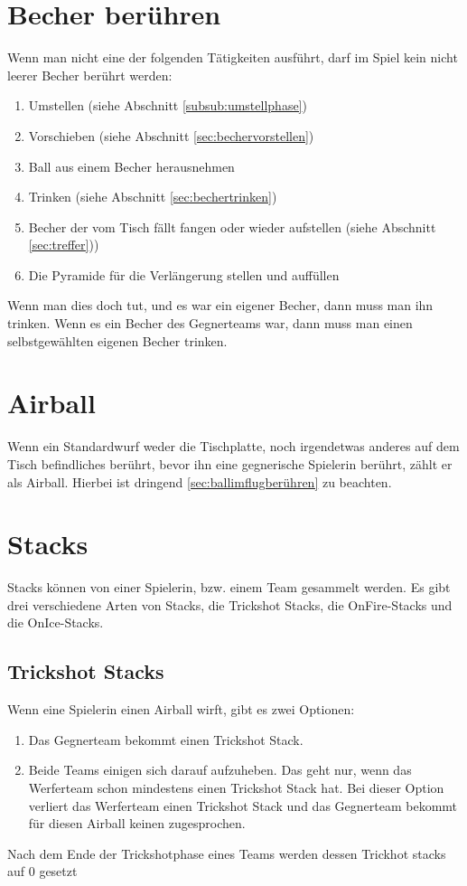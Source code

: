 \documentclass[a5paper, 12pt]{book}
\begin{document}
\section{Becher berühren}\label{sec:becherberühren}
Wenn man nicht eine der folgenden Tätigkeiten ausführt, darf im Spiel kein nicht leerer Becher berührt werden:
\begin{enumerate} [(1)]
    \item Umstellen (siehe Abschnitt \ref{subsub:umstellphase})
    \item Vorschieben (siehe Abschnitt \ref{sec:bechervorstellen})
    \item Ball aus einem Becher herausnehmen
    \item Trinken (siehe Abschnitt \ref{sec:bechertrinken})
    \item Becher der vom Tisch fällt fangen oder wieder aufstellen (siehe Abschnitt \ref{sec:treffer}))
    \item Die Pyramide für die Verlängerung stellen und auffüllen
    
\end{enumerate}
Wenn man dies doch tut, und es war ein eigener Becher, dann muss man ihn trinken. Wenn es ein Becher des Gegnerteams war, dann muss man einen selbstgewählten eigenen Becher trinken. 
\section{Airball}\label{sec:Airball}
Wenn ein Standardwurf weder die Tischplatte, noch irgendetwas anderes auf dem Tisch befindliches berührt, bevor ihn eine gegnerische Spielerin berührt, zählt er als Airball. Hierbei ist dringend \ref{sec:ballimflugberühren} zu beachten. 
\section{Stacks}\label{sec:stacks}
Stacks können von einer Spielerin, bzw. einem Team gesammelt werden. Es gibt drei verschiedene Arten von Stacks, die Trickshot Stacks, die OnFire-Stacks und die OnIce-Stacks.
\subsection{Trickshot Stacks}\label{sub:trickshotstacks}
Wenn eine Spielerin einen Airball wirft, gibt es zwei Optionen:
\begin{enumerate} [(1)]
    \item Das Gegnerteam bekommt einen Trickshot Stack.
    \item Beide Teams einigen sich darauf aufzuheben. Das geht nur, wenn das Werferteam schon mindestens einen Trickshot Stack hat. Bei dieser Option verliert das Werferteam einen Trickshot Stack und das Gegnerteam bekommt für diesen Airball keinen zugesprochen. 
\end{enumerate}
Nach dem Ende der Trickshotphase eines Teams werden dessen Trickhot stacks auf 0 gesetzt
\end{document}
